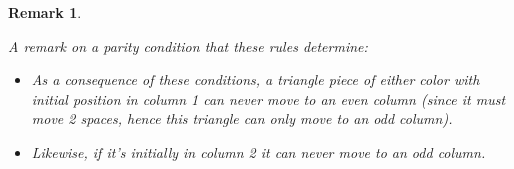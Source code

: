 \documentclass[12pt]{article}
\newtheorem{remark}{Remark}
\begin{document}


\begin{remark}
\label{rmk:parity1}
{\rm
A remark on a parity condition that these rules determine:

\begin{itemize}
\item  
  As a consequence of these conditions, a triangle piece of either color
with initial position in column 1 can never move to an even column
(since it must move 2 spaces, hence this triangle can only move
to an odd column).

\item  
  Likewise, if it's initially in column 2 it can never move to an odd
  column.
\end{itemize}
}
\end{remark}
\end{document}

